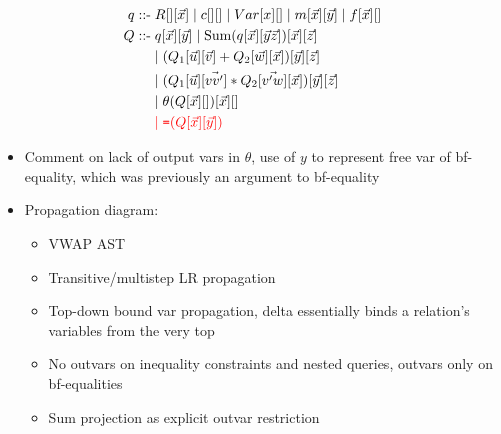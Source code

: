\begin{align*} 
\q \; \mbox{::-} & \; R[][\vec{x}] \;|\; c[][] \;|\; Var[x][] \;|\;
m[\vec{x}][\vec{y}]\;|\; f[\vec{x}][]
\\
\comment{
& \;|\; \theta[x,y][] \;|\; \theta_c[x][] \;|\;
\calceq_\q[][y] \;|\; \calceq[x][y]
\\
}
\qq \; \mbox{::-} & \; \q[\vec{x}][\vec{y}] \;|\;
\calcsum(\q[\vec{x}][\vec{y}\vec{z}])[\vec{x}][\vec{z}] \\ & \;|\;
(\qqa[\vec{u}][\vec{v}] + \qqb[\vec{w}][\vec{x}])[\vec{y}][\vec{z}]
\\
& \;|\;
(\qqa[\vec{u}][\vec{vv'}] * \qqb[\vec{v'w}][\vec{x}])[\vec{y}][\vec{z}]
\\
& \;|\; \theta(\qq[\vec{x}][])[\vec{x}][]
\\
& \todo{\;|\; \calceq(\qq[\vec{x}][\vec{y}])}
\end{align*}

\begin{itemize}
\item Comment on lack of output vars in $\theta$, use of $y$ to
represent free var of bf-equality, which was previously an argument to
bf-equality

\item Propagation diagram:
    \begin{itemize}
      \item VWAP AST
      \item Transitive/multistep LR propagation
      \item Top-down bound var propagation, delta essentially binds a relation's
      variables from the very top
      \item No outvars on inequality constraints and nested queries, outvars only
      on bf-equalities
      \item Sum projection as explicit outvar restriction
    \end{itemize}

\end{itemize}

\noindent{}

